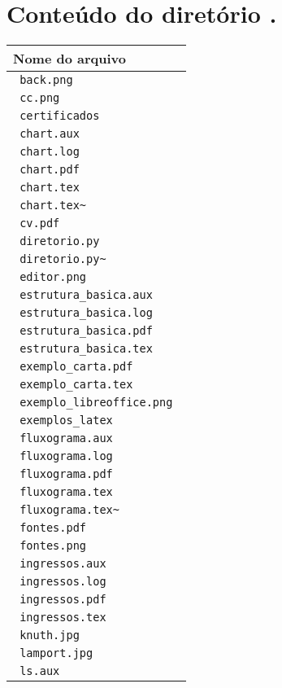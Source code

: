 \documentclass{article}
\begin{document}
\section*{Conteúdo do diretório  . }
\begin{center}
\begin{longtable}{|l|}\hline
\hline Nome do arquivo \\ \hline \endfirsthead
\verb+ back.png +\\ 
\verb+ cc.png +\\ 
\verb+ certificados +\\ 
\verb+ chart.aux +\\ 
\verb+ chart.log +\\ 
\verb+ chart.pdf +\\ 
\verb+ chart.tex +\\ 
\verb+ chart.tex~ +\\ 
\verb+ cv.pdf +\\ 
\verb+ diretorio.py +\\ 
\verb+ diretorio.py~ +\\ 
\verb+ editor.png +\\ 
\verb+ estrutura_basica.aux +\\ 
\verb+ estrutura_basica.log +\\ 
\verb+ estrutura_basica.pdf +\\ 
\verb+ estrutura_basica.tex +\\ 
\verb+ exemplo_carta.pdf +\\ 
\verb+ exemplo_carta.tex +\\ 
\verb+ exemplo_libreoffice.png +\\ 
\verb+ exemplos_latex +\\ 
\verb+ fluxograma.aux +\\ 
\verb+ fluxograma.log +\\ 
\verb+ fluxograma.pdf +\\ 
\verb+ fluxograma.tex +\\ 
\verb+ fluxograma.tex~ +\\ 
\verb+ fontes.pdf +\\ 
\verb+ fontes.png +\\ 
\verb+ ingressos.aux +\\ 
\verb+ ingressos.log +\\ 
\verb+ ingressos.pdf +\\ 
\verb+ ingressos.tex +\\ 
\verb+ knuth.jpg +\\ 
\verb+ lamport.jpg +\\ 
\verb+ ls.aux +\\ 

\end{longtable}
\end{center}
\end{document}
